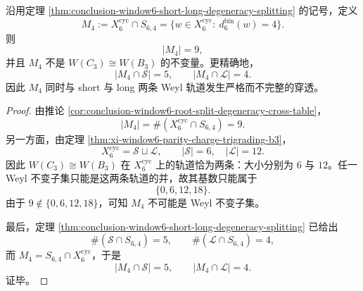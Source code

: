 \begin{theorem}\label{thm:conclusion-window6-maxdeg-weyl-breaking}
沿用定理 \ref{thm:conclusion-window6-short-long-degeneracy-splitting} 的记号，定义
\[
M_4:=X_6^{\mathrm{cyc}}\cap S_{6,4}
=
\{w\in X_6^{\mathrm{cyc}}:\ d_6^{\mathrm{bin}}(w)=4\}.
\]
则
\[
\boxed{\;
|M_4|=9,\;}
\]
并且 \(M_4\) 不是 \(W(C_3)\cong W(B_3)\) 的不变量。更精确地，
\[
\boxed{\;
|M_4\cap\mathcal S|=5,\qquad |M_4\cap\mathcal L|=4.\;}
\]
因此 \(M_4\) 同时与 short 与 long 两条 Weyl 轨道发生严格而不完整的穿透。
\end{theorem}
\begin{proof}
由推论 \ref{cor:conclusion-window6-root-split-degeneracy-cross-table}，
\[
|M_4|=\#(X_6^{\mathrm{cyc}}\cap S_{6,4})=9.
\]
另一方面，由定理 \ref{thm:xi-window6-parity-charge-trigrading-b3}，
\[
X_6^{\mathrm{cyc}}=\mathcal S\sqcup \mathcal L,
\qquad
|\mathcal S|=6,\quad |\mathcal L|=12.
\]
因此 \(W(C_3)\cong W(B_3)\) 在 \(X_6^{\mathrm{cyc}}\) 上的轨道恰为两条：大小分别为 \(6\) 与 \(12\)。任一 Weyl 不变子集只能是这两条轨道的并，故其基数只能属于
\[
\{0,6,12,18\}.
\]
由于 \(9\notin\{0,6,12,18\}\)，可知 \(M_4\) 不可能是 Weyl 不变子集。

最后，定理 \ref{thm:conclusion-window6-short-long-degeneracy-splitting} 已给出
\[
\#(\mathcal S\cap S_{6,4})=5,
\qquad
\#(\mathcal L\cap S_{6,4})=4,
\]
而 \(M_4=S_{6,4}\cap X_6^{\mathrm{cyc}}\)，于是
\[
|M_4\cap \mathcal S|=5,
\qquad
|M_4\cap \mathcal L|=4.
\]
证毕。
\end{proof}


